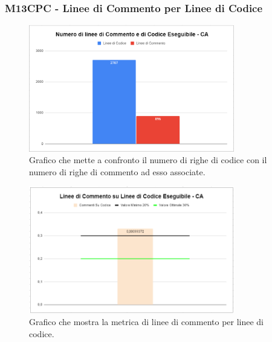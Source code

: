 \subsubsection{M13CPC - Linee di Commento per Linee di Codice}
\begin{figure}[H]
 \centering\includegraphics[width=0.8\textwidth, height=0.8\textheight,keepaspectratio]{images/CA-Commento.png}
  \caption{Grafico che mette a confronto il numero di righe di codice con il numero di righe di commento ad esso associate.}
\end{figure}  
\begin{figure}[H]
  \centering\includegraphics[width=0.8\textwidth, height=0.8\textheight,keepaspectratio]{images/CA-Commento-Codice.png}
   \caption{Grafico che mostra la metrica di linee di commento per linee di codice.}
 \end{figure}  

